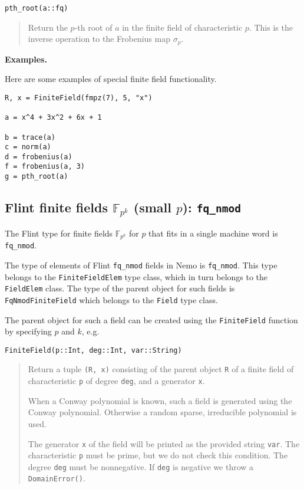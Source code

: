 \documentclass[a4paper,10pt]{article}
\newcommand{\F}{\mathbb{F}}
\newcommand{\code}{\lstinline}
\newcommand{\desc}[1]{\vspace{-3mm}\begin{quote}#1\end{quote}}
\begin{document}
{{\begin{lstlisting}
pth_root(a::fq)
\end{lstlisting}

\desc{Return the $p$-th root of $a$ in the finite field of characteristic
$p$. This is the inverse operation to the Frobenius map $\sigma_p$.}

\textbf{Examples.}

Here are some examples of special finite field functionality.

\begin{lstlisting}
R, x = FiniteField(fmpz(7), 5, "x")

a = x^4 + 3x^2 + 6x + 1

b = trace(a)
c = norm(a)
d = frobenius(a)
f = frobenius(a, 3)
g = pth_root(a)
\end{lstlisting}

\subsection{Flint finite fields $\F_{p^k}$ (small $p$): \code|fq_nmod|}

The Flint type for finite fields $\F_{p^k}$ for $p$ that fits in a single machine
word is \code{fq_nmod}.

The type of elements of Flint \code{fq_nmod} fields in Nemo is \code{fq_nmod}.
This type belongs to the \code{FiniteFieldElem} type class, which in turn belongs
to the \code{FieldElem} class. The type of the parent object for such fields is
\code{FqNmodFiniteField} which belongs to the \code{Field} type class.

The parent object for such a field can be created using the \code{FiniteField}
function by specifying $p$ and $k$, e.g.

\begin{lstlisting}
FiniteField(p::Int, deg::Int, var::String)
\end{lstlisting}

\desc{Return a tuple \code{(R, x)} consisting of the parent object \code{R} of
a finite field of characteristic \code{p} of degree \code{deg}, and a
generator \code{x}.

When a Conway polynomial is known, such a field is generated using the
Conway polynomial. Otherwise a random sparse, irreducible polynomial is used.

The generator \code{x} of the field will be printed as the provided string
\code{var}. The characteristic \code{p} must be prime, but we do not check this
condition. The degree \code{deg} must be nonnegative. If \code{deg} is negative
we throw a \code{DomainError()}.}

}}
\end{document}
